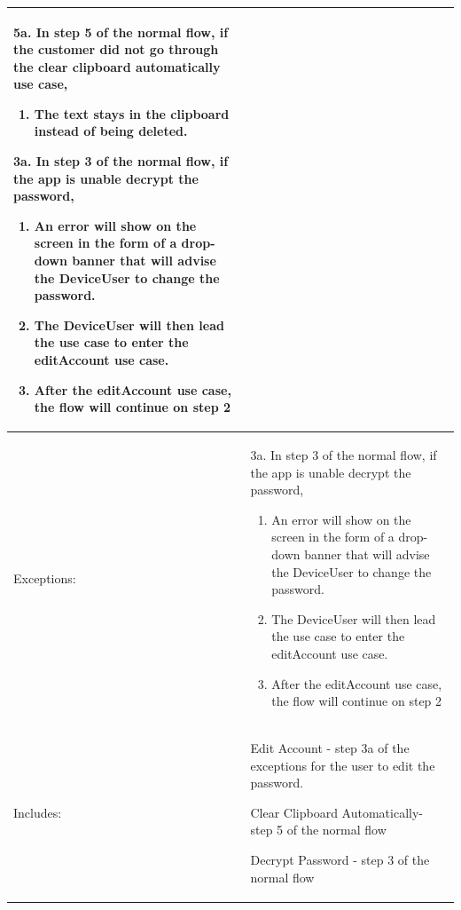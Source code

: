 \documentclass[stu]{apa7}
\newcommand{\nextitemblank}{\par\hspace*{\labelsep}\hspace*{\labelsep}}
\begin{document}
{{{{\begin{xltabular}{\textwidth}{|l|X|}
                                   \nextitemblank 5a. In step 5 of the normal flow, if the customer did not go through the clear clipboard automatically use case,
                                   \begin{enumerate}
                                     \item The text stays in the clipboard instead of being deleted.
                                   \end{enumerate}

                                   \nextitemblank 3a. In step 3 of the normal flow, if the app is unable decrypt the password,
                                   \begin{enumerate}
                                     \item An error will show on the screen in the form of a drop-down banner that will advise the DeviceUser to change the password.
                                     \item The DeviceUser will then lead the use case to enter the editAccount use case.
                                     \item After the editAccount use case, the flow will continue on step 2
                                   \end{enumerate} \\ \hline

              Exceptions: & 3a. In step 3 of the normal flow, if the app is unable decrypt the password,
                            \begin{enumerate}
                              \item An error will show on the screen in the form of a drop-down banner that will advise the DeviceUser to change the password.
                              \item The DeviceUser will then lead the use case to enter the editAccount use case.
                              \item After the editAccount use case, the flow will continue on step 2
                            \end{enumerate} \\ \hline

              Includes: & \nextitemblank Edit Account - step 3a of the exceptions for the user to edit the password.
                          \nextitemblank Clear Clipboard Automatically- step 5 of the normal flow
                          \nextitemblank Decrypt Password - step 3 of the normal flow \\ \hline



\end{xltabular}}}}}
\end{document}
